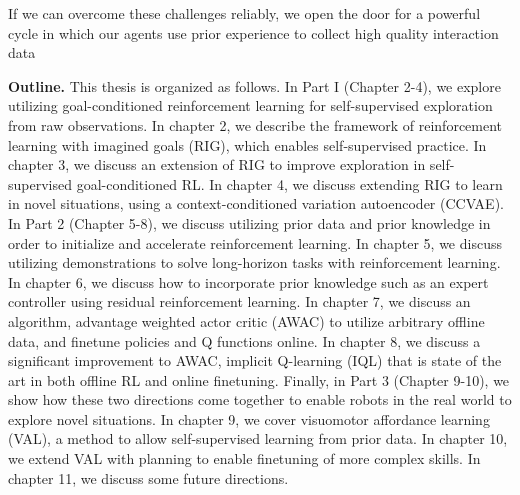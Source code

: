 If we can overcome these challenges reliably, we open the door for a powerful cycle in which our agents use prior experience to collect high quality interaction data

\textbf{Outline.} This thesis is organized as follows. In Part I (Chapter 2-4), we explore utilizing goal-conditioned reinforcement learning for self-supervised exploration from raw observations. In chapter 2, we describe the framework of reinforcement learning with imagined goals (RIG), which enables self-supervised practice. In chapter 3, we discuss an extension of RIG to improve exploration in self-supervised goal-conditioned RL. In chapter 4, we discuss extending RIG to learn in novel situations, using a context-conditioned variation autoencoder (CCVAE). In Part 2 (Chapter 5-8), we discuss utilizing prior data and prior knowledge in order to initialize and accelerate reinforcement learning. In chapter 5, we discuss utilizing demonstrations to solve long-horizon tasks with reinforcement learning. In chapter 6, we discuss how to incorporate prior knowledge such as an expert controller using residual reinforcement learning. In chapter 7, we discuss an algorithm, advantage weighted actor critic (AWAC) to utilize arbitrary offline data, and finetune policies and Q functions online. In chapter 8, we discuss a significant improvement to AWAC, implicit Q-learning (IQL) that is state of the art in both offline RL and online finetuning. Finally, in Part 3 (Chapter 9-10), we show how these two directions come together to enable robots in the real world to explore novel situations. In chapter 9, we cover visuomotor affordance learning (VAL), a method to allow self-supervised learning from prior data. In chapter 10, we extend VAL with planning to enable finetuning of more complex skills. In chapter 11, we discuss some future directions.





